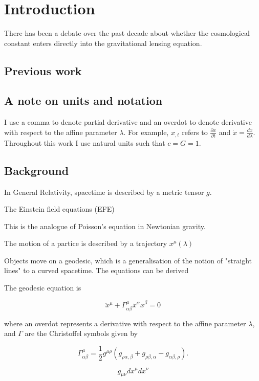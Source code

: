 \chapter{Introduction}

There has been a debate over the past decade about whether the cosmological constant enters directly into the gravitational lensing equation. 

\section{Previous work}

\section{A note on units and notation}
I use a comma to denote partial derivative and an overdot to denote derivative with respect to the affine parameter $\lambda$. For example, $x_{,t}$ refers to $\frac{\partial x}{\partial t}$ and $\dot{x} = \frac{dx}{d\lambda}$. Throughout this work I use natural units such that $c = G = 1$. 

\section{Background}

In General Relativity, spacetime is described by a metric tensor $g$. 

The Einstein field equations (EFE) 

This is the analogue of Poisson's equation in Newtonian gravity. 

The motion of a partice is described by a trajectory $x^{\mu}(\lambda)$

Objects move on a geodesic, which is a generalisation of the notion of "straight lines" to a curved spacetime. The equations can be derived 

The geodesic equation is 

\begin{equation}
  \ddot{x}^{\mu} + \Gamma^{\mu}_{\alpha \beta} \dot{x}^{\alpha} \dot{x}^{\beta} = 0 
  \label{eq:geodesic-eqn}
\end{equation}

where an overdot represents a derivative with respect to the affine parameter $\lambda$, and $\Gamma$ are the Christoffel symbols given by

\begin{equation}
  \Gamma^{\mu}_{\alpha \beta} = \frac{1}{2} g^{\mu \rho} (g_{\rho \alpha, \beta} + g_{\rho \beta, \alpha} - g_{\alpha \beta, \rho}).
  \label{eq:christoffels}
\end{equation}

\begin{equation}
  g_{\mu \nu} dx^{\mu} dx^{\nu}
  \label{eq:null-condition}
\end{equation}

